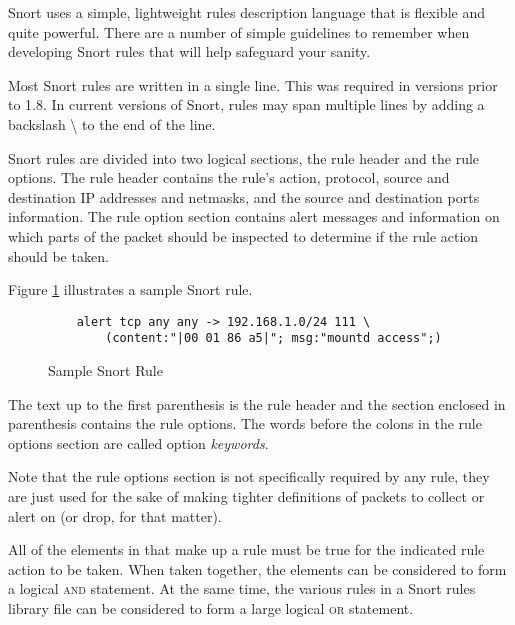 \documentclass[english]{report}
\newenvironment{note}{
\samepage
    \vspace{10pt}{\textsf{
        {\hspace{7pt}\Huge{$\triangle$\hspace{-12.5pt}{\Large{$^!$}}}}\hspace{5pt}
        {\Large{NOTE}}
    }
    }
   \begin{center}
    \par\vspace{-17pt}

    \begin{lrbox}{\savepar}
    \begin{minipage}[r]{6in}
}
{
    \end{minipage}
    \end{lrbox}
    \fbox{
        \usebox{
            \savepar
	}
    }
    \par\vskip10pt
    \end{center}
}
\newenvironment{note}{
        \begin{rawhtml}
        <p><table border="1"><tr><td><b>
        Note:&nbsp;&nbsp;</b>
        \end{rawhtml}
}{
        \begin{rawhtml}
        </b></td></tr></table></p>
        \end{rawhtml}
}
\begin{document}
Snort uses a simple, lightweight rules description language that is flexible
and quite powerful. There are a number of simple guidelines to remember when
developing Snort rules that will help safeguard your sanity.

Most Snort rules are written in a single line. This was required in versions
prior to 1.8. In current versions of Snort, rules may span multiple lines by
adding a backslash \textbackslash{} to the end of the line. 

Snort rules are divided into two logical sections, the rule header and the rule
options. The rule header contains the rule's action, protocol, source and
destination IP addresses and netmasks, and the source and destination ports
information. The rule option section contains alert messages and information on
which parts of the packet should be inspected to determine if the rule action
should be taken.

Figure \ref{Sample Snort Rule} illustrates a sample Snort rule.

\begin{center}
\begin{figure}
\begin{verbatim}
    alert tcp any any -> 192.168.1.0/24 111 \
        (content:"|00 01 86 a5|"; msg:"mountd access";)
\end{verbatim}

\caption{Sample Snort Rule}
\label{Sample Snort Rule}
\end{figure}
\end{center}

The text up to the first parenthesis is the rule header and the section
enclosed in parenthesis contains the rule options. The words before the colons
in the rule options section are called option \emph{keywords}. 

\begin{note}

Note that the rule options section is not specifically required by any rule,
they are just used for the sake of making tighter definitions of packets to
collect or alert on (or drop, for that matter). 

\end{note}

All of the elements in that make up a rule must be true for the indicated rule
action to be taken. When taken together, the elements can be considered to form
a logical \textsc{and} statement. At the same time, the various rules in a
Snort rules library file can be considered to form a large logical \textsc{or}
statement. 
\end{document}

